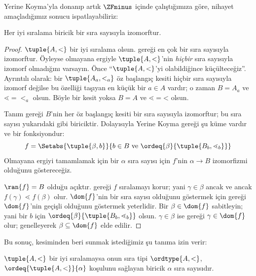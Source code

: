\documentclass[../../../include/open-logic-section]{subfiles}
\begin{document}

Yerine Koyma'yla donanıp artık $\ZFminus$ içinde çalıştığımıza göre,
nihayet amaçladığımız sonucu ispatlayabiliriz:

\begin{thm}
Her iyi sıralama biricik bir sıra sayısıyla izomorftur.
\end{thm}

\begin{proof}
$\tuple{A,<}$ bir iyi sıralama olsun. 
gereği en çok bir sıra sayısıyla izomorftur. Öyleyse olmayana ergiyle
$\tuple{A,<}$'nin \emph{hiçbir} sıra sayısıyla izomorf olmadığını varsayın.
Önce ``$\tuple{A,<}$'yi olabildiğince küçülteceğiz''. Ayrıntılı olarak:
bir $\tuple{A_a,<_a}$ öz başlangıç kesiti hiçbir sıra sayısıyla izomorf
değilse bu özelliği taşıyan en küçük bir $a\in A$ vardır; o zaman
$B=A_a$ ve $\mathord{\lessdot}=\mathord{<_a}$ olsun. Böyle bir kesit yoksa
$B=A$ ve $\mathord{\lessdot}=\mathord{<}$ olsun.

Tanım gereği $B$'nin her öz başlangıç kesiti bir sıra sayısıyla izomorftur;
bu sıra sayısı yukarıdaki gibi biriciktir. Dolayısıyla Yerine Koyma gereği
şu küme vardır ve bir fonksiyondur:
\[
	f = \Setabs{\tuple{\beta, b}}{b \in B\text{ ve }\ordeq{\beta}{\tuple{B_b, \lessdot_b}}}
\]
Olmayana ergiyi tamamlamak için bir $\alpha$ sıra sayısı için $f$'nin
$\alpha\to B$ izomorfizmi olduğunu göstereceğiz.

$\ran{f}=B$ olduğu açıktır.  gereği $f$
sıralamayı korur; yani $\gamma\in\beta$ ancak ve ancak
$f(\gamma)\lessdot f(\beta)$ olur. $\dom{f}$'nin bir sıra sayısı olduğunu
göstermek için  gereği $\dom{f}$'nin
geçişli olduğunu göstermek yeterlidir. Bir $\beta\in\dom{f}$ sabitleyin;
yani bir $b$ için
$\ordeq{\beta}{\tuple{B_b,\lessdot_b}}$ olsun. $\gamma\in\beta$ ise
 gereği $\gamma\in\dom{f}$ olur;
genelleyerek $\beta\subseteq\dom{f}$ elde edilir.
\end{proof}

Bu sonuç,  kesiminden beri sunmak istediğimiz şu tanıma izin
verir:

\begin{defn}
$\tuple{A,<}$ bir iyi sıralamaysa onun sıra tipi $\ordtype{A,<}$,
$\ordeq{\tuple{A,<}}{\alpha}$ koşulunu sağlayan biricik $\alpha$ sıra
sayısıdır.
\end{defn}
\end{document}
